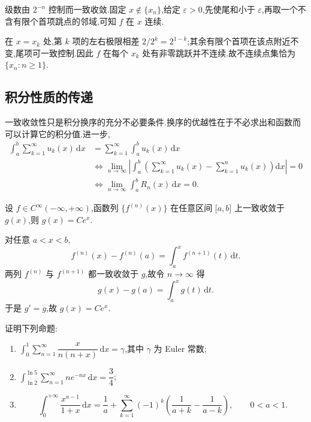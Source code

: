 \begin{solution}
    级数由 $2^{-n}$ 控制而一致收敛.固定 $x\notin\{x_n\}$,给定
    $\varepsilon>0$,先使尾和小于 $\varepsilon$,再取一个不含有限个首项跳点的邻域,可知 $f$ 在 $x$ 连续.

    在 $x=x_k$ 处,第 $k$ 项的左右极限相差 $2/2^k=2^{1-k}$;其余有限个首项在该点附近不变,尾项可一致控制.因此 $f$ 在每个 $x_k$ 处有非零跳跃并不连续.故不连续点集恰为 $\{x_n:n\geq1\}$.
\end{solution}



\subsection{积分性质的传递}

一致收敛性只是积分换序的充分不必要条件.换序的优越性在于不必求出和函数而可以计算它的积分值.进一步,
\[
    \begin{aligned}
        \int_a^b\sum\limits_{k=1}^{\infty}u_k(x)\,\mathrm{d}x
         & =\sum\limits_{k=1}^{\infty}\int_a^b u_k(x)\,\mathrm{d}x                                                                                  \\
         & \iff \lim\limits_{n\to\infty}\left|\int_a^b\left(\sum\limits_{k=1}^{\infty}u_k(x)-\sum\limits_{k=1}^{n}u_k(x)\right)\mathrm{d}x\right|=0 \\
         & \iff \lim\limits_{n\to\infty}\int_a^bR_n(x)\,\mathrm{d}x=0.
    \end{aligned}
\]

\begin{example}
    设 $f\in C^{\infty}(-\infty,+\infty)$,函数列 $\{f^{(n)}(x)\}$ 在任意区间 $\lbrack a,b\rbrack$ 上一致收敛于 $g(x)$,则 $g(x)=Ce^x$.
\end{example}
\exampleblank

\begin{solution}
    对任意 $a<x<b$,
    \[
        f^{(n)}(x)-f^{(n)}(a)=\int_a^xf^{(n+1)}(t)\,\mathrm{d}t.
    \]
    两列 $f^{(n)}$ 与 $f^{(n+1)}$ 都一致收敛于 $g$,故令 $n\to\infty$ 得
    \[
        g(x)-g(a)=\int_a^xg(t)\,\mathrm{d}t.
    \]
    于是 $g'=g$,故 $g(x)=Ce^x$.
\end{solution}

\begin{example}
    证明下列命题:
    \begin{enumerate}
        \item $\displaystyle\int_0^1\sum\limits_{n=1}^{\infty}\dfrac{x}{n(n+x)}\,\mathrm{d}x=\gamma$,其中 $\gamma$ 为 Euler 常数;
        \item $\displaystyle\int_{\ln2}^{\ln5}\sum\limits_{n=1}^{\infty}ne^{-nx}\,\mathrm{d}x=\dfrac{3}{4}$;
        \item
              \[
                  \int_0^{+\infty}\dfrac{x^{a-1}}{1+x}\,\mathrm{d}x
                  =\dfrac{1}{a}+\sum\limits_{k=1}^{\infty}(-1)^k
                  \left(\dfrac{1}{a+k}-\dfrac{1}{a-k}\right),
                  \qquad 0<a<1.
              \]
    \end{enumerate}
\end{example}
\exampleblank

